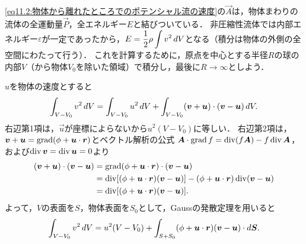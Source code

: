 \eqref{eq11.2:物体から離れたところでのポテンシャル流の速度}の$\vec{A}$は，物体まわりの流体の全運動量$\vec{P}$，全エネルギー$E$と結びついている．
非圧縮性流体では内部エネルギー$\varepsilon$が一定であったから，$\displaystyle E = \frac{1}{2}\rho \int v^2\, dV$となる（積分は物体の外側の全空間にわたって行う）．
これを計算するために，原点を中心とする半径$R$の球の内部$V$（から物体$V_0$を除いた領域）で積分し，最後に$R\to\infty$としよう．

$u$を物体の速度とすると
\[
    \int_{V-V_0} v^2 \, dV = \int_{V-V_0} u^2 \, dV + \int_{V-V_0} (\vb*{v}+\vb*{u})\cdot(\vb*{v}-\vb*{u}) \, dV .
\]
右辺第1項は，$\vec{u}$が座標によらないから$u^2(V-V_0)$に等しい．
右辺第2項は，$\vb*{v}+\vb*{u}=\operatorname{grad}(\phi+\vb*{u}\cdot\vb*{r})$とベクトル解析の公式
$\vb*{A}\cdot\operatorname{grad} f = \operatorname{div}(f\vb*{A}) - f\operatorname{div}\vb*{A}$，
および$\operatorname{div}\vb*{v}=\operatorname{div}\vb*{u}=0$より
\begin{align*}
    (\vb*{v}+\vb*{u})\cdot(\vb*{v}-\vb*{u}) &= \operatorname{grad}(\phi+\vb*{u}\cdot\vb*{r}) \cdot (\vb*{v}-\vb*{u}) \\
    &= \operatorname{div}[ (\phi+\vb*{u}\cdot\vb*{r}) (\vb*{v}-\vb*{u}) ] - (\phi+\vb*{u}\cdot\vb*{r}) \operatorname{div}(\vb*{v}-\vb*{u}) \\
    &= \operatorname{div}[ (\phi+\vb*{u}\cdot\vb*{r}) (\vb*{v}-\vb*{u}) ] .
\end{align*}
よって，$V$の表面を$S$，物体表面を$S_0$として，Gaussの発散定理を用いると
\[
    \int_{V-V_0} v^2 \, dV = u^2(V-V_0) + \int_{S+S_0} (\phi+\vb*{u}\cdot\vb*{r}) (\vb*{v}-\vb*{u}) \cdot d\vb*{S} .
\]

